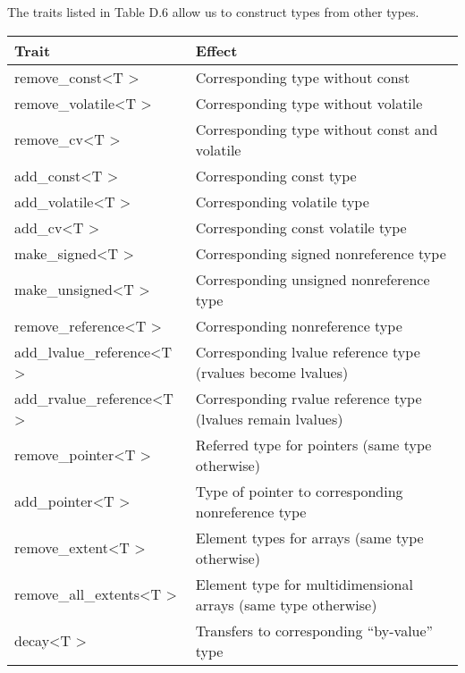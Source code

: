 
The traits listed in Table D.6 allow us to construct types from other types.

\begin{table}[H]
	\begin{center}
	\begin{tabular}{l|l}
		\hline
		\textbf{Trait}                                    & \textbf{Effect}                                                \\ \hline
		remove\_const\textless{}T \textgreater{}          & Corresponding type without const                               \\ \hline
		remove\_volatile\textless{}T \textgreater{}       & Corresponding type without volatile                            \\ \hline
		remove\_cv\textless{}T \textgreater{}             & Corresponding type without const and volatile                  \\ \hline
		add\_const\textless{}T \textgreater{}             & Corresponding const type                                       \\ \hline
		add\_volatile\textless{}T \textgreater{}          & Corresponding volatile type                                    \\ \hline
		add\_cv\textless{}T \textgreater{}                & Corresponding const volatile type                              \\ \hline
		make\_signed\textless{}T \textgreater{}           & Corresponding signed nonreference type                         \\ \hline
		make\_unsigned\textless{}T \textgreater{}         & Corresponding unsigned nonreference type                       \\ \hline
		remove\_reference\textless{}T \textgreater{}      & Corresponding nonreference type                                \\ \hline
		add\_lvalue\_reference\textless{}T \textgreater{} & Corresponding lvalue reference type (rvalues become lvalues)   \\ \hline
		add\_rvalue\_reference\textless{}T \textgreater{} & Corresponding rvalue reference type (lvalues remain lvalues)   \\ \hline
		remove\_pointer\textless{}T \textgreater{}        & Referred type for pointers (same type otherwise)               \\ \hline
		add\_pointer\textless{}T \textgreater{}           & Type of pointer to corresponding nonreference type             \\ \hline
		remove\_extent\textless{}T \textgreater{}         & Element types for arrays (same type otherwise)                 \\ \hline
		remove\_all\_extents\textless{}T \textgreater{}   & Element type for multidimensional arrays (same type otherwise) \\ \hline
		decay\textless{}T \textgreater{}                  & Transfers to corresponding “by-value” type                     \\ \hline
	\end{tabular}
	\end{center}
\end{table}

